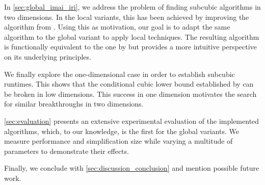 In \cref{sec:global_imai_iri}, we address the problem of finding subcubic algorithms in two dimensions. In the local variants, this has been achieved by improving the algorithm from \citeauthor{computational_geometric_methods_for_polygonal_approximations_of_a_curve}. Using this as motivation, our goal is to adapt the same algorithm to the global variant to apply local techniques. The resulting algorithm is functionally equivalent to the one by \citeauthor{global_curve_simplification} but provides a more intuitive perspective on its underlying principles.

We finally explore the one-dimensional case in order to establish subcubic runtimes. This shows that the conditional cubic lower bound established by \citeauthor{polyline_simplification_has_cubic_complexity_bringmannetal} can be broken in low dimensions. This success in one dimension motivates the search for similar breakthroughs in two dimensions.

\cref{sec:evaluation} presents an extensive experimental evaluation of the implemented algorithms, which, to our knowledge, is the first for the global variants. We measure performance and simplification size while varying a multitude of parameters to demonstrate their effects.

Finally, we conclude with \cref{sec:discussion_conclusion} and mention possible future work.
 
